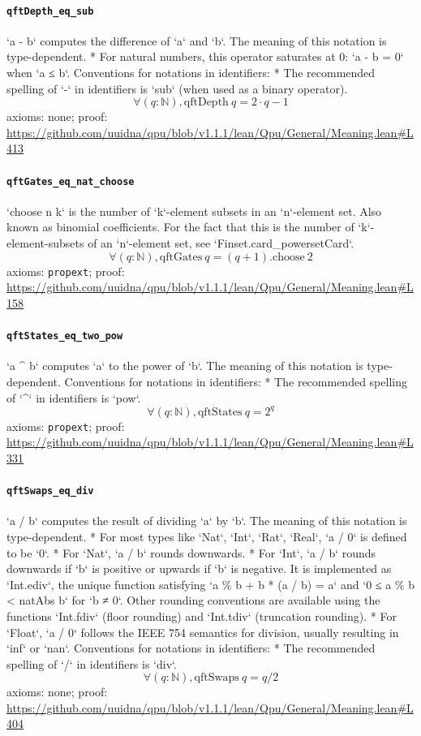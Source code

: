 \documentclass[11pt]{article}
\begin{document}
\paragraph{\texttt{qftDepth\_eq\_sub}}
`a - b` computes the difference of `a` and `b`. The meaning of this notation is type-dependent. * For natural numbers, this operator saturates at 0: `a - b = 0` when `a ≤ b`.   Conventions for notations in identifiers:   * The recommended spelling of `-` in identifiers is `sub` (when used as a binary operator).
\[ \forall (q : \mathbb{N}), \mathrm{qftDepth}\ q = 2 \cdot q - 1 \]
\noindent axioms: none; proof: \url{https://github.com/uuidna/qpu/blob/v1.1.1/lean/Qpu/General/Meaning.lean\#L413}

\paragraph{\texttt{qftGates\_eq\_nat\_choose}}
`choose n k` is the number of `k`-element subsets in an `n`-element set. Also known as binomial coefficients. For the fact that this is the number of `k`-element-subsets of an `n`-element set, see `Finset.card\_powersetCard`.
\[ \forall (q : \mathbb{N}), \mathrm{qftGates}\ q = (q + 1)\mathrm{.choose}\ 2 \]
\noindent axioms: \texttt{propext}; proof: \url{https://github.com/uuidna/qpu/blob/v1.1.1/lean/Qpu/General/Meaning.lean\#L158}

\paragraph{\texttt{qftStates\_eq\_two\_pow}}
`a \^{} b` computes `a` to the power of `b`. The meaning of this notation is type-dependent.   Conventions for notations in identifiers:   * The recommended spelling of `\^{}` in identifiers is `pow`.
\[ \forall (q : \mathbb{N}), \mathrm{qftStates}\ q = 2 ^{q} \]
\noindent axioms: \texttt{propext}; proof: \url{https://github.com/uuidna/qpu/blob/v1.1.1/lean/Qpu/General/Meaning.lean\#L331}

\paragraph{\texttt{qftSwaps\_eq\_div}}
`a / b` computes the result of dividing `a` by `b`. The meaning of this notation is type-dependent. * For most types like `Nat`, `Int`, `Rat`, `Real`, `a / 0` is defined to be `0`. * For `Nat`, `a / b` rounds downwards. * For `Int`, `a / b` rounds downwards if `b` is positive or upwards if `b` is negative.   It is implemented as `Int.ediv`, the unique function satisfying   `a \% b + b * (a / b) = a` and `0 ≤ a \% b < natAbs b` for `b ≠ 0`.   Other rounding conventions are available using the functions   `Int.fdiv` (floor rounding) and `Int.tdiv` (truncation rounding). * For `Float`, `a / 0` follows the IEEE 754 semantics for division,   usually resulting in `inf` or `nan`.   Conventions for notations in identifiers:   * The recommended spelling of `/` in identifiers is `div`.
\[ \forall (q : \mathbb{N}), \mathrm{qftSwaps}\ q = q / 2 \]
\noindent axioms: none; proof: \url{https://github.com/uuidna/qpu/blob/v1.1.1/lean/Qpu/General/Meaning.lean\#L404}
\end{document}
